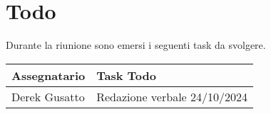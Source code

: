 \section{Todo}
Durante la riunione sono emersi i seguenti task da svolgere.

\begin{center}
  \begin{tabular}{|p{5cm}|p{8cm}|}
    \hline
    \textbf{Assegnatario}       & \textbf{Task Todo} \\ \hline
    Derek Gusatto   &  Redazione verbale 24/10/2024 \\ \hline
  \end{tabular}
\end{center}